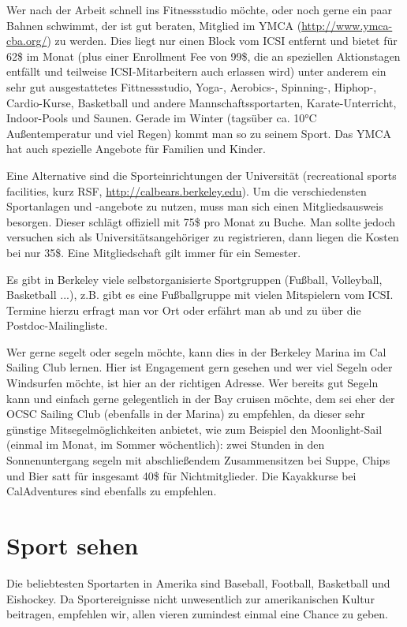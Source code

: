 \documentclass[a4paper]{scrreprt}
\begin{document}
Wer nach der Arbeit schnell ins Fitnessstudio möchte, oder noch gerne
ein paar Bahnen schwimmt, der ist gut beraten, Mitglied im YMCA
(\url{http://www.ymca-cba.org/}) zu werden. Dies liegt nur einen Block
vom ICSI entfernt und bietet für 62\$ im Monat (plus einer Enrollment
Fee von 99\$, die an speziellen Aktionstagen entfällt und teilweise
ICSI-Mitarbeitern auch erlassen wird) unter anderem ein sehr gut
ausgestattetes Fittnessstudio, Yoga-, Aerobics-, Spinning-, Hiphop-,
Cardio-Kurse, Basketball und andere Mannschaftssportarten,
Karate-Unterricht, Indoor-Pools und Saunen. Gerade im Winter (tagsüber
ca. 10°C Außentemperatur und viel Regen) kommt man so zu seinem
Sport. Das YMCA hat auch spezielle Angebote für Familien und Kinder. 

Eine Alternative sind die Sporteinrichtungen der Universität
(recreational sports facilities, kurz RSF,
\url{http://calbears.berkeley.edu}). Um die verschiedensten
Sportanlagen und -angebote zu nutzen, muss man sich einen
Mitgliedsausweis besorgen. Dieser schlägt offiziell mit 75\$ pro
Monat zu Buche. Man sollte jedoch versuchen sich als
Universitätsangehöriger zu registrieren, dann liegen die Kosten bei
nur 35\$. Eine Mitgliedschaft gilt immer für ein Semester.

Es gibt in Berkeley viele selbstorganisierte Sportgruppen (Fußball,
Volleyball, Basketball ...), z.B. gibt es eine Fußballgruppe mit
vielen Mitspielern vom ICSI. Termine hierzu erfragt man vor Ort oder
erfährt man ab und zu über die Postdoc-Mailingliste.

Wer gerne segelt oder segeln möchte, kann dies in der Berkeley Marina
im Cal Sailing Club lernen. Hier ist Engagement gern gesehen und wer
viel Segeln oder Windsurfen möchte, ist hier an der richtigen
Adresse. Wer bereits gut Segeln kann und einfach gerne gelegentlich in
der Bay cruisen möchte, dem sei eher der OCSC Sailing Club (ebenfalls
in der Marina) zu empfehlen, da dieser sehr günstige
Mitsegelmöglichkeiten anbietet, wie zum Beispiel den Moonlight-Sail
(einmal im Monat, im Sommer wöchentlich): zwei Stunden in den
Sonnenuntergang segeln mit abschließendem Zusammensitzen bei Suppe,
Chips und Bier satt für insgesamt 40\$ für Nichtmitglieder.
Die Kayakkurse bei CalAdventures sind ebenfalls zu empfehlen.

\section{Sport sehen}

Die beliebtesten Sportarten in Amerika sind Baseball, Football, Basketball und Eishockey. Da Sportereignisse nicht unwesentlich zur amerikanischen Kultur beitragen, empfehlen wir, allen vieren zumindest einmal eine Chance zu geben.
\end{document}
